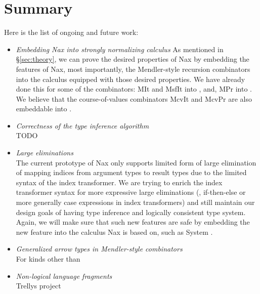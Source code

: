 \section{Summary}

Here is the list of ongoing and future work:
\begin{itemize}
\item \emph{Embedding Nax into strongly normalizing calculus}
	As mentioned in \S\ref{sec:theory}, we can prove the desired properties
	of Nax by embedding the features of Nax, most importantly,
	the Mendler-style recursion combinators into the calculus
	equipped with those desired properties. We have already done this for
	some of the combinators: \textsf{MIt} and \textsf{MsfIt} into \Fi, and,
	\textsf{MPr} into \Fixi. We believe that the course-of-values
	combinators \textsf{McvIt} and \textsf{McvPr} are also embeddable
	into \Fixi.
\item \emph{Correctness of the type inference algorithm}\\
	TODO
\item \emph{Large eliminations}\\
	The current prototype of Nax only supports limited
	form of large elimination of mapping indices from
	argument types to result types due to the limited syntax
	of the index transformer. We are trying to enrich the index
	transformer syntax for more expressive large eliminations
	(\eg, if-then-else or more generally case expressions
	in index transformers) and still maintain our design goals of
	having type inference and logically consistent type system.
	Again, we will make sure that such new features are safe by embedding
	the new feature into the calculus Nax is based on, such as System \Fi.
\item \emph{Generalized arrow types in Mendler-style combinators}\\
	For kinds other than
\item \emph{Non-logical language fragments}\\
	Trellys project \cite{TODO_cite_some_trellys_papers}
\end{itemize}

